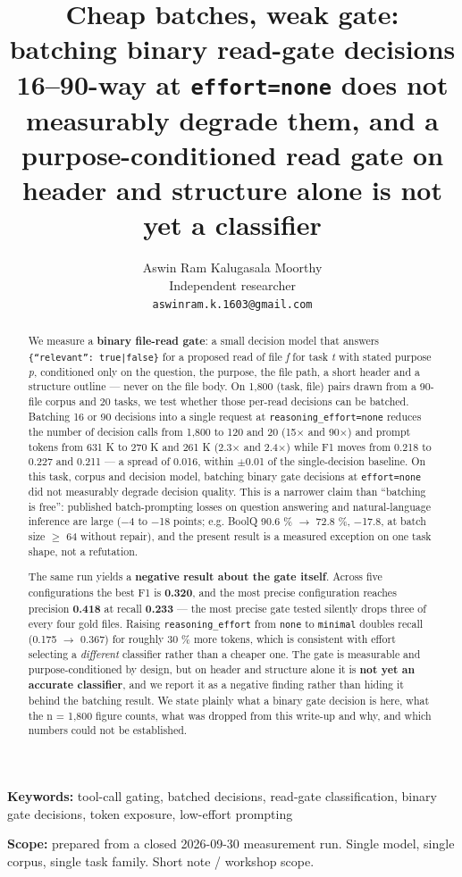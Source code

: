 \documentclass[11pt,a4paper]{article}
\title{Cheap batches, weak gate: batching binary read-gate decisions 16--90-way at \texttt{effort=none} does not measurably degrade them, and a purpose-conditioned read gate on header and structure alone is not yet a classifier}
\author{Aswin Ram Kalugasala Moorthy\\ Independent researcher\\ \texttt{aswinram.k.1603@gmail.com}}
\date{}   %
\begin{document}
\maketitle
\noindent\textbf{Keywords:} tool-call gating, batched decisions, read-gate classification, binary gate decisions, token exposure, low-effort prompting

\textbf{Scope:} prepared from a closed 2026-09-30 measurement run. Single model, single corpus, single task family. Short note / workshop scope.

\begin{abstract}
We measure a \textbf{binary file-read gate}: a small decision model that answers \texttt{\{``relevant'': true|false\}} for a proposed read of file \emph{f} for task \emph{t} with stated purpose \emph{p}, conditioned only on the question, the purpose, the file path, a short header and a structure outline --- never on the file body. On 1,800 (task, file) pairs drawn from a 90-file corpus and 20 tasks, we test whether those per-read decisions can be batched. Batching 16 or 90 decisions into a single request at \texttt{reasoning\_effort=none} reduces the number of decision calls from 1,800 to 120 and 20 (15$\times$ and 90$\times$) and prompt tokens from 631 K to 270 K and 261 K (2.3$\times$ and 2.4$\times$) while F1 moves from 0.218 to 0.227 and 0.211 --- a spread of 0.016, within $\pm$0.01 of the single-decision baseline. On this task, corpus and decision model, batching binary gate decisions at \texttt{effort=none} did not measurably degrade decision quality. This is a narrower claim than ``batching is free'': published batch-prompting losses on question answering and natural-language inference are large ($-$4 to $-$18 points; e.g. BoolQ 90.6 \% $\to$ 72.8 \%, $-$17.8, at batch size $\ge$ 64 without repair), and the present result is a measured exception on one task shape, not a refutation.

The same run yields a \textbf{negative result about the gate itself}. Across five configurations the best F1 is \textbf{0.320}, and the most precise configuration reaches precision \textbf{0.418} at recall \textbf{0.233} --- the most precise gate tested silently drops three of every four gold files. Raising \texttt{reasoning\_effort} from \texttt{none} to \texttt{minimal} doubles recall (0.175 $\to$ 0.367) for roughly 30 \% more tokens, which is consistent with effort selecting a \emph{different} classifier rather than a cheaper one. The gate is measurable and purpose-conditioned by design, but on header and structure alone it is \textbf{not yet an accurate classifier}, and we report it as a negative finding rather than hiding it behind the batching result. We state plainly what a binary gate decision is here, what the n = 1,800 figure counts, what was dropped from this write-up and why, and which numbers could not be established.

\end{abstract}
\end{document}
